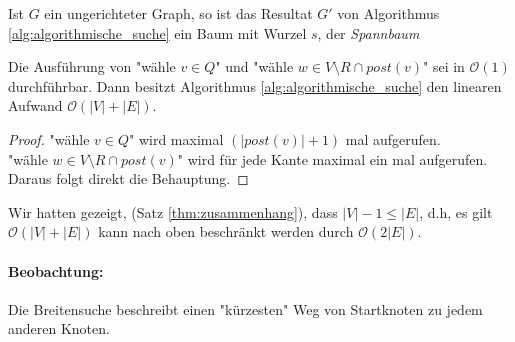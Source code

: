 \begin{remark}
Ist $G$ ein ungerichteter Graph, so ist das Resultat $G'$ von Algorithmus \ref{alg:algorithmische_suche} ein Baum mit Wurzel $s$, der \emph{Spannbaum}
\end{remark}
\begin{theorem}
	\label{thm:algorithmische_suche}
	Die Ausführung von "wähle $v \in Q$" und "wähle $w \in  V \setminus R \cap post(v)$" sei in $\mathcal{O}(1)$ durchführbar. Dann besitzt Algorithmus \ref{alg:algorithmische_suche} den linearen Aufwand $\mathcal{O}(|V|+|E|)$.
\end{theorem}
\begin{proof}
"wähle $v \in Q$" wird maximal $(|post(v)|+1)$ mal aufgerufen. \\
"wähle $w \in V \setminus R \cap post(v)$" wird für jede Kante maximal ein mal aufgerufen. \\
Daraus folgt direkt die Behauptung.
\end{proof}
Wir hatten gezeigt, (Satz \ref{thm:zusammenhang}), dass $|V|-1 \le |E|$, d.h, es gilt $\mathcal{O}(|V|+|E|)$ kann nach oben beschränkt werden durch $\mathcal{O}(2|E|)$.
\paragraph{Beobachtung:} Die Breitensuche beschreibt einen "kürzesten" Weg von Startknoten zu jedem anderen Knoten.

